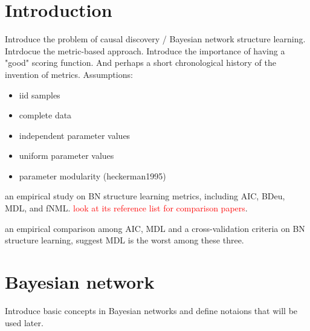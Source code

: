 \section{Introduction}
Introduce the problem of causal discovery / Bayesian network structure learning. Intrdocue the metric-based approach. Introduce the importance of having a "good" scoring function. And perhaps a short chronological history of the invention of metrics. 
Assumptions:
\begin{itemize}
\item iid samples
\item complete data
\item independent parameter values
\item uniform parameter values
\item parameter modularity (heckerman1995)
\end{itemize}

\cite{liu2012empirical} an empirical study on BN structure learning metrics, including AIC, BDeu, MDL, and fNML. \textcolor{red}{look at its reference list for comparison papers}.

\cite{allen2000model} an empirical comparison among AIC, MDL and a cross-validation criteria on BN structure learning, suggest MDL is the worst among these three. 

\section{Bayesian network}
Introduce basic concepts in Bayesian networks and define notaions that will be used later. 

